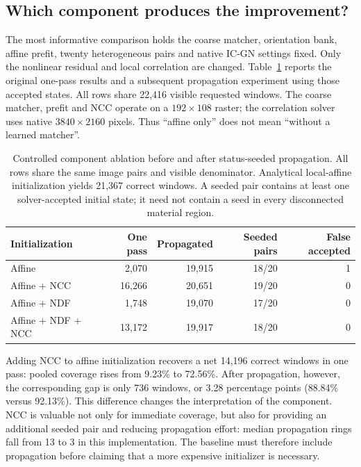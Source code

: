 \subsection{Which component produces the improvement?}
The most informative comparison holds the coarse matcher, orientation bank, affine prefit, twenty heterogeneous pairs and native IC-GN settings fixed. Only the nonlinear residual and local correlation are changed. Table~\ref{tab:causal} reports the original one-pass results and a subsequent propagation experiment using those accepted states. All rows share 22,416 visible requested windows. The coarse matcher, prefit and NCC operate on a $192\times108$ raster; the correlation solver uses native $3840\times2160$ pixels. Thus ``affine only'' does not mean ``without a learned matcher''.

\begin{table}[tb]\centering\small
\caption{Controlled component ablation before and after status-seeded propagation. All rows share the same image pairs and visible denominator. Analytical local-affine initialization yields 21,367 correct windows. A seeded pair contains at least one solver-accepted initial state; it need not contain a seed in every disconnected material region.}\label{tab:causal}
\begin{tabular}{lrrrr}\toprule
Initialization & One pass & Propagated & Seeded pairs & False accepted\\\midrule
Affine & 2,070 & 19,915 &18/20&1\\
Affine + NCC &16,266&20,651&19/20&0\\
Affine + NDF &1,748&19,070&17/20&0\\
Affine + NDF + NCC &13,172&19,917&18/20&0\\\bottomrule
\end{tabular}\end{table}

Adding NCC to affine initialization recovers a net 14,196 correct windows in one pass: pooled coverage rises from 9.23\% to 72.56\%. After propagation, however, the corresponding gap is only 736 windows, or 3.28 percentage points (88.84\% versus 92.13\%). This difference changes the interpretation of the component. NCC is valuable not only for immediate coverage, but also for providing an additional seeded pair and reducing propagation effort: median propagation rings fall from 13 to 3 in this implementation. The baseline must therefore include propagation before claiming that a more expensive initializer is necessary.

